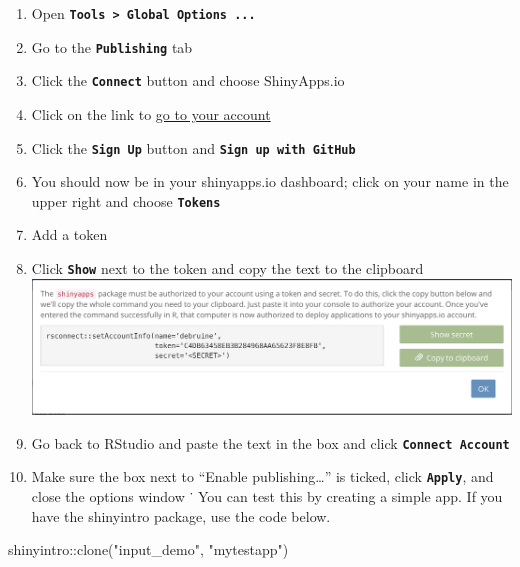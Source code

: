 \documentclass[
  oneside]{book}
\newenvironment{Shaded}{\begin{snugshade}}{\end{snugshade}}
\newcommand{\FunctionTok}[1]{\textcolor[rgb]{0.00,0.00,0.00}{#1}}
\newcommand{\NormalTok}[1]{#1}
\newcommand{\SpecialCharTok}[1]{\textcolor[rgb]{0.00,0.00,0.00}{#1}}
\newcommand{\StringTok}[1]{\textcolor[rgb]{0.31,0.60,0.02}{#1}}
\providecommand{\tightlist}{%
  \setlength{\itemsep}{0pt}\setlength{\parskip}{0pt}}
\begin{document}
\begin{enumerate}
\def\labelenumi{\arabic{enumi}.}
\tightlist
\item
  Open \textbf{\texttt{Tools\ \textgreater{}\ Global\ Options\ ...}}
\item
  Go to the \textbf{\texttt{Publishing}} tab
\item
  Click the \textbf{\texttt{Connect}} button and choose ShinyApps.io
\item
  Click on the link to \href{https://www.shinyapps.io/}{go to your account}
\item
  Click the \textbf{\texttt{Sign\ Up}} button and \textbf{\texttt{Sign\ up\ with\ GitHub}}
\item
  You should now be in your shinyapps.io dashboard; click on your name in the upper right and choose \textbf{\texttt{Tokens}}
\item
  Add a token
\item
  Click \textbf{\texttt{Show}} next to the token and copy the text to the clipboard
  \includegraphics{images/saio_secret.png}
\item
  Go back to RStudio and paste the text in the box and click \textbf{\texttt{Connect\ Account}}
\item
  Make sure the box next to ``Enable publishing\ldots{}'' is ticked, click \textbf{\texttt{Apply}}, and close the options window
  ˙
  You can test this by creating a simple app. If you have the shinyintro package, use the code below.
\end{enumerate}

\begin{Shaded}
\begin{Highlighting}[]
\NormalTok{shinyintro}\SpecialCharTok{::}\FunctionTok{clone}\NormalTok{(}\StringTok{"input\_demo"}\NormalTok{, }\StringTok{"mytestapp"}\NormalTok{)}
\end{Highlighting}
\end{Shaded}
\end{document}
